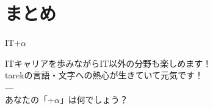 \documentclass[lualatex,aspectratio=169]{beamer}
\begin{document}
\section{まとめ}

\begin{frame}[t]{IT+$\alpha$}
    \vspace{3em}
    \begin{center}
        {\Large ITキャリアを歩みながらIT以外の分野も楽しめます！}\\
        \vspace{0.5em}
        {\color{lightgray}tarekの言語・文字への熱心が生きていて元気です！}\\
        \vspace{1.5em}
        {\color{lightgray}---}\\
        \vspace{1.5em}
        {\color{lightgray}あなたの「+$\alpha$」は何でしょう？}
    \end{center}
\end{frame}
\end{document}
